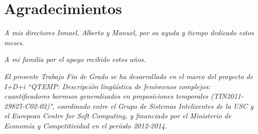 \chapter*{Agradecimientos}

\thispagestyle{empty}

\vspace{4cm}

\begin{center}
\textit{A mis directores Ismael, Alberto y Manuel, por su ayuda y tiempo dedicado estos meses.}
\end{center}

\vspace{0.5cm}

\begin{center}
\textit{A mi familia por el apoyo recibido estos años.}
\end{center}

\vspace{1cm}

\textit{El presente Trabajo Fin de Grado se ha desarrollado en el marco del proyecto de I+D+i ``QTEMP: Descripción lingüística de fenómenos complejos: cuantificadores borrosos generalizados en proposiciones temporales (TIN2011-29827-C02-02)", coordinado entre el Grupo de Sistemas Intelixentes de la USC y el European Centre for Soft Computing, y financiado por el Ministerio de Economía y Competitividad en el período 2012-2014.}